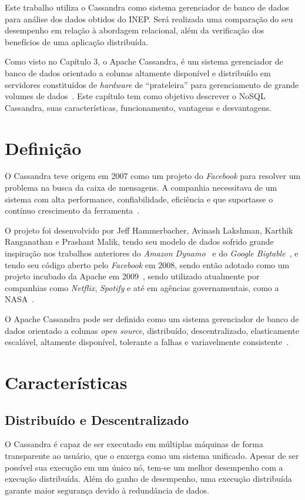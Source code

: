 Este trabalho utiliza o Cassandra como sistema gerenciador de banco de dados para análise dos dados obtidos do INEP. Será realizada uma comparação do seu desempenho em relação à abordagem relacional, além da verificação dos benefícios de uma aplicação distribuída.

Como visto no Capítulo 3, o Apache Cassandra, é um sistema gerenciador de banco de dados orientado a colunas altamente disponível e distribuído em servidores constituídos de \emph{hardware} de \enquote{prateleira} para gerenciamento de grande volumes de dados~\cite{lakshmancassandra}. Este capítulo tem como objetivo descrever o NoSQL Cassandra, suas características, funcionamento, vantagens e desvantagens.

\section{Definição}
O Cassandra teve origem em 2007 como um projeto do \emph{Facebook} para resolver um problema na busca da caixa de mensagens. A companhia necessitava de um sistema com alta performance, confiabilidade, eficiência e que suportasse o contínuo crescimento da ferramenta~\cite{lakshmancassandra}. 

O projeto foi desenvolvido por Jeff Hammerbacher, Avinash Lakshman, Karthik Ranganathan e Prashant Malik, tendo seu modelo de dados sofrido grande inspiração nos trabalhos anteriores do \emph{Amazon Dynamo}~\cite{dynamo} e do \emph{Google Bigtable}~\cite{bigtable}, e tendo seu código aberto pelo \emph{Facebook} em 2008, sendo então adotado como um projeto incubado da Apache em 2009~\cite{cassandraguide}, sendo utilizado atualmente por companhias como \emph{Netflix}, \emph{Spotify} e até em agências governamentais, como a NASA~\cite{cassandracompanies}. 

O Apache Cassandra pode ser definido como um sistema gerenciador de banco de dados orientado a colunas \emph{open source}, distribuído, descentralizado, elasticamente escalável, altamente disponível, tolerante a falhas e variavelmente consistente~\cite{cassandraguide}.


\section{Características}

\subsection*{Distribuído e Descentralizado}
O Cassandra é capaz de ser executado em múltiplas máquinas de forma transparente ao usuário, que o enxerga como um sistema unificado. Apesar de ser possível sua execução em um único nó, tem-se um melhor desempenho com a execução distribuída. Além do ganho de desempenho, uma execução distribuída garante maior segurança devido à redundância de dados.

